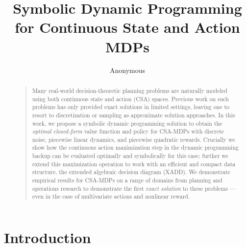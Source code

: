 \documentclass[letterpaper]{article}
\begin{document}
%
\title{Symbolic Dynamic Programming for Continuous State and Action MDPs}
\author{Anonymous}
\maketitle
\begin{abstract}
\begin{quote}
Many real-world decision-theoretic planning problems are naturally
modeled using both continuous state and action (CSA) spaces.  Previous
work on such problems has only provided exact solutions in limited
settings, leaving one to resort to discretization or sampling as
approximate solution approaches.  In this work, we propose a symbolic
dynamic programming solution to obtain the \emph{optimal closed-form}
value function and policy for CSA-MDPs with discrete noise, piecewise
linear dynamics, and piecewise quadratic rewards.  Crucially we show
how the continuous action maximization step in the dynamic programming
backup can be evaluated optimally and symbolically for this case;
further we extend this maximization operation to work with an
efficient and compact data structure, the extended algebraic decision
diagram (XADD).  We demonstrate empirical results for CSA-MDPs on a
range of domains from planning and operations research to demonstrate
the first \emph{exact solution} to these problems --- even in the case
of multivariate actions and nonlinear reward.
\end{quote}
\end{abstract}

\section{Introduction}


\end{document}
